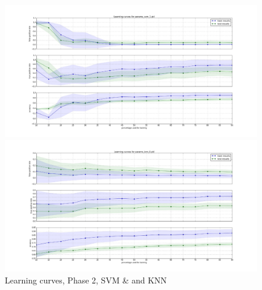 \documentclass[10pt, conference, compsocconf]{IEEEtran}
\begin{document}
\begin{figure}[h]
\vskip 0.2in
\begin{center}
\centerline{\includegraphics[width=\columnwidth, scale=1]{./Figures/Lc_Ds2_P40-60_SVM}}
\centerline{\includegraphics[width=\columnwidth, scale=1]{./Figures/Lc_Ds2_P40-60_kNN}}
\caption{Learning curves, Phase 2, SVM \& and KNN}
\label{learning curves}
\end{center}
\vskip -0.2in
\end{figure} 
\end{document}
